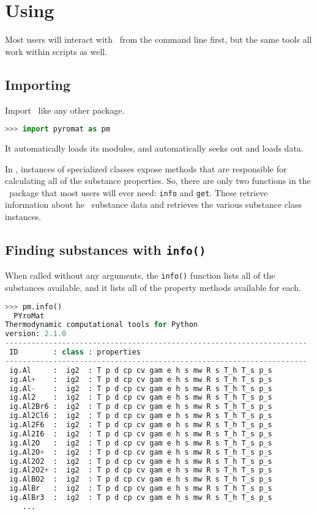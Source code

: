 \section{Using \PM }

Most users will interact with \PM\ from the command line first, but the same tools all work within scripts as well.

\subsection{Importing}

Import \PM\ like any other package.  
\begin{lstlisting}[language=Python]
>>> import pyromat as pm
\end{lstlisting}
It automatically loads its modules, and automatically seeks out and loads data.

In \PM, instances of specialized classes expose methods that are responsible for calculating all of the substance properties.  So, there are only two functions in the \PM\ package that most users will ever need: \texttt{info} and \texttt{get}.  These retrieve information about he \PM\ substance data and retrieves the various substance class instances.  

\subsection{Finding substances with \texttt{info()}}

When called without any arguments, the \texttt{info()} function lists all of the substances available, and it lists all of the property methods available for each.
\begin{lstlisting}[language=Python,style=tinystyle]
>>> pm.info()
  PYroMat
Thermodynamic computational tools for Python
version: 2.1.0
---------------------------------------------------------------------
 ID        : class : properties
---------------------------------------------------------------------
 ig.Al     :  ig2  : T p d cp cv gam e h s mw R s T_h T_s p_s        
 ig.Al+    :  ig2  : T p d cp cv gam e h s mw R s T_h T_s p_s        
 ig.Al-    :  ig2  : T p d cp cv gam e h s mw R s T_h T_s p_s        
 ig.Al2    :  ig2  : T p d cp cv gam e h s mw R s T_h T_s p_s        
 ig.Al2Br6 :  ig2  : T p d cp cv gam e h s mw R s T_h T_s p_s        
 ig.Al2Cl6 :  ig2  : T p d cp cv gam e h s mw R s T_h T_s p_s        
 ig.Al2F6  :  ig2  : T p d cp cv gam e h s mw R s T_h T_s p_s        
 ig.Al2I6  :  ig2  : T p d cp cv gam e h s mw R s T_h T_s p_s        
 ig.Al2O   :  ig2  : T p d cp cv gam e h s mw R s T_h T_s p_s        
 ig.Al2O+  :  ig2  : T p d cp cv gam e h s mw R s T_h T_s p_s        
 ig.Al2O2  :  ig2  : T p d cp cv gam e h s mw R s T_h T_s p_s        
 ig.Al2O2+ :  ig2  : T p d cp cv gam e h s mw R s T_h T_s p_s        
 ig.AlBO2  :  ig2  : T p d cp cv gam e h s mw R s T_h T_s p_s        
 ig.AlBr   :  ig2  : T p d cp cv gam e h s mw R s T_h T_s p_s        
 ig.AlBr3  :  ig2  : T p d cp cv gam e h s mw R s T_h T_s p_s      
    ...
\end{lstlisting}

